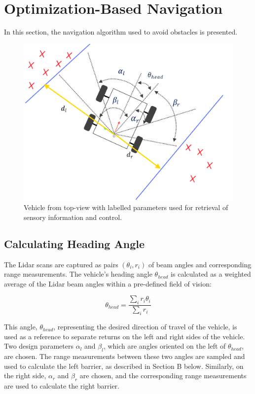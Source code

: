 \documentclass[conference]{IEEEtran}
\begin{document}
\section{Optimization-Based Navigation}
In this section, the navigation algorithm used to avoid obstacles is presented. 

\begin{figure}
    \centering
    \includegraphics[scale=0.2]{diagram.png}
    \caption{Vehicle from top-view with labelled parameters used for retrieval of sensory information and control.}
    \label{Figure 3}
\end{figure}

\subsection{Calculating Heading Angle}

The Lidar scans are captured as pairs $(\theta_i, r_i)$ of beam angles and corresponding range measurements. The vehicle's heading angle $\theta_{head}$ is calculated as a weighted average of the Lidar beam angles within a pre-defined field of vision:

\[\theta_{head} = \frac{\sum_{i} r_i \theta_i}{\sum_{i} r_i} \]

This angle, $\theta_{head}$, representing the desired direction of travel of the vehicle, is used as a reference to separate returns on the left and right sides of the vehicle. Two design parameters $\alpha_l$ and $\beta_l$, which are angles oriented on the left of $\theta_{head}$, are chosen.  The range measurements between these two angles are sampled and used to calculate the left barrier, as described in Section B below. Similarly, on the right side, $\alpha_r$ and $\beta_r$ are chosen, and the corresponding range measurements are used to calculate the right barrier. 
\end{document}
